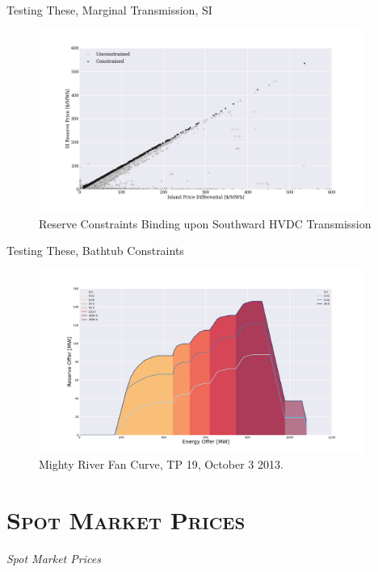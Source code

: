 \documentclass[xcolor=x11names,compress]{beamer}
\renewcommand{\(}{\begin{columns}}
\renewcommand{\)}{\end{columns}}
\newcommand{\<}[1]{\begin{column}{#1}}
\renewcommand{\>}{\end{column}}
\begin{document}
\begin{frame}{Testing These, Marginal Transmission, SI}
\begin{figure}
\includegraphics[width=0.95\textwidth]{img/si_reserve_prices_island_differential.png}
\caption{Reserve Constraints Binding upon Southward HVDC Transmission}
\end{figure}
\end{frame}

\begin{frame}{Testing These, Bathtub Constraints}
\begin{figure}
\includegraphics[width=0.95\textwidth]{img/mrpl_fan_curve.png}
\caption{Mighty River Fan Curve, TP 19, October 3 2013.}
\end{figure}
\end{frame}

\section{\scshape Spot Market Prices}
\begin{frame}
\vspace{1.5cm}
\begin{center}
{\Huge\textit{Spot Market Prices}}
\end{center}
\end{frame}
\end{document}
